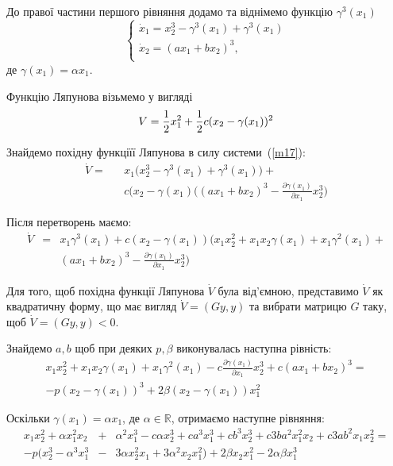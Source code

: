 \documentclass{article}
\begin{document}
До правої частини першого рівняння додамо та віднімемо функцію $\gamma^3(x_1)$ 
\begin{equation} \label{m17}
    \begin{cases}
    \dot x_1 =x_{2}^3 -\gamma^3(x_1)+\gamma^3(x_1) \\
    \dot x_2 = (ax_1+bx_2)^3,\\
    \end{cases}
\end{equation}
де $\gamma(x_1) = \alpha x_1$.

Функцію Ляпунова візьмемо у вигляді  
\begin{equation}
    V = \frac{1}{2}x_{1}^2 +\frac{1}{2}c(x_2 - \gamma(x_1) )^2\\
\end{equation}

Знайдемо похідну функціїї Ляпунова в силу системи~(\ref{m17}):
\begin{eqnarray}
    \dot V =&& x_1 \Big (x_2^3 - \gamma^3(x_1)+\gamma^3(x_1) \Big) +\nonumber \\
    &&c(x_2 - \gamma(x_1)
    \Big((ax_1+bx_2)^3-\frac{\partial \gamma(x_1)}{\partial x_1}x_2^3 \Big)
\end{eqnarray}

Після перетворень маємо:
\begin{eqnarray}
    \dot V&=& x_1\gamma^3(x_1)+c(x_2 - \gamma(x_1))
   \Big (x_1x_2^2 + x_1x_2\gamma(x_1) + x_{1}\gamma^2(x_1) +\nonumber\\ 
    &&(ax_1+bx_2)^3 - \frac{\partial \gamma(x_1)}{\partial x_1}x_{2}^3\Big)
\end{eqnarray}

Для того, щоб похідна функції Ляпунова $\dot V$ була від'ємною, представимо
 $\dot V$ як квадратичну форму, що має вигляд $\dot V =(Gy,y)$ 
та вибрати матрицю $G$ таку, щоб  $\dot V =(Gy,y) < 0$.

Знайдемо $a,b$ щоб при деяких $p, \beta$ виконувалась наступна рівність:
\begin{eqnarray}
    x_1x_2^2+x_1x_2\gamma(x_1) + x_1 \gamma^2(x_1) - 
    c\frac{\partial \gamma(x_1)}{\partial x_1}x_2^3 + c(ax_1+bx_2)^3 = \nonumber\\
    -p(x_2-\gamma(x_1))^3 +2\beta(x_2-\gamma(x_1))x_{1}^2 
\end{eqnarray}

Оскільки $\gamma(x_1)=\alpha x_1$, де $\alpha \in \mathbb{R}$,
отримаємо наступне рівняння:
\begin{eqnarray}
x_1x_{2}^2 + \alpha x_{1}^2x_2 &+& \alpha^2x_{1}^3 -c\alpha x_{2}^3 
+ ca^3x_{1}^3 +c b^3x_{2}^3 + c3ba^2x_{1}^2x_2+\nonumber
c3ab^2x_1x_{2}^2 =\\
-p(x_2^3 - \alpha^{3}x_{1}^3 &-& 3\alpha x_2^2x_{1} + 3\alpha^2x_2x_{1}^2)+
2\beta x_2x_{1}^2 - 2\alpha \beta x_1^3
\end{eqnarray}
\end{document}
